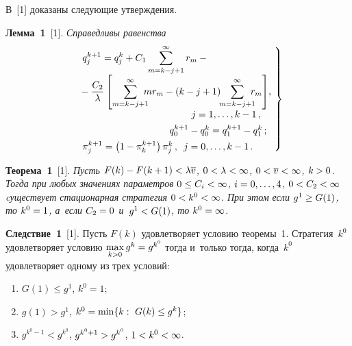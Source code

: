 \begin{multicols}{2}
  \vspace*{-2pt}
     
  В~[1] доказаны следующие утверждения.
  

  
\vspace*{2pt}
  
  \noindent
  \textbf{Лемма~1}~[1]. \textit{Справедливы равенства}
  \begin{equation}
  \left.
  \begin{array}{l}
  q_j^{k+1} =\displaystyle q_j^k +C_1\sum\limits_{m=k-j+1}^\infty r_m-{}\\[4pt]
\!\! \displaystyle  {}- \fr{C_2}{\lambda} \left[ \sum\limits^\infty_{m=k-j+1}
 \!\!\!\! mr_m -(k-j+1) \!\!
\sum\limits^\infty_{m=k-j+1}\!\!\!\! r_m\right]\!,\\[4pt]
 \hspace*{40mm}j=1,\ldots, k-1\,,
 \\[4pt]
   \hspace*{32mm}q_0^{k+1} -q_0^k=q_1^{k+1}-q_1^k\,;
\\[4pt]
  \pi_j^{k+1} =\left(1-\pi_k^{k+1}\right) \pi_j^k\,,\enskip j=0,\ldots, k-1\,.
  \end{array}\!
  \right\}\!\!
  \label{e9-ag}
  \end{equation}
  
  \vspace*{-3pt}
  
  
  \noindent
  \textbf{Теорема~1}~[1]. \textit{Пусть $F(k)\hm- F(k+1)\hm< 
\lambda\overline{v}$, $0\hm<\lambda \hm<\infty$, $0\hm< \overline{v}\hm< 
\infty$, $k\hm>0$. Тогда при любых значениях параметров $0\hm\leq C_i \hm< 
\infty$, $i\hm=0,\ldots, 4$, $0\hm< C_2\hm< \infty$ cуществует стационарная 
стратегия $0\hm<k^0\hm<\infty$. При этом если $g^1\hm\geq G(1)$, то 
$k^0\hm=1$, а~если $C_2\hm=0$ и~$g^1\hm<G(1)$, то} $k^0\hm=\infty$.
  
    
  \noindent
  \textbf{Следствие~1}~[1]. Пусть $F(k)$ удовлетворяет условию теоремы~1. 
Стратегия~$k^0$ удовлетворяет условию $\max\limits_{k>0} g^k\hm= g^{k^0}$ 
тогда и~только тогда, когда~$k^0$ удовлетворяет одному из трех условий:
  \begin{enumerate}[(1)]
\item $G(1)\leq g^1$, $k^0=1$;
\item $g(1)>g^1$, $k^0\hm=\min \{ k:\ G(k)\leq g^k\}$;
\item $g^{k^0-1}< g^{k^0}$, $g^{k^0+1}\hm> g^{k^0}$, $1\hm<k^0\hm<\infty$.
\end{enumerate}


\end{multicols}
